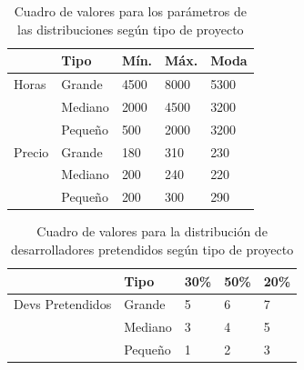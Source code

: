 \begin{table}[H]
\begin{center}
\begin{tabular}{|l|l|l|l|l|}
\hline
                    & Tipo      & Mín.    & Máx.    & Moda\\
\hline
    Horas           & Grande    & 4500    & 8000    & 5300\\
\hline
                    & Mediano   & 2000    & 4500    & 3200\\
\hline
                    & Pequeño   & 500     & 2000    & 3200\\
\hline
    Precio          & Grande    & 180     & 310     & 230\\
\hline
                    & Mediano   & 200     & 240     & 220\\
\hline
                    & Pequeño   & 200     & 300     & 290\\
\hline
\end{tabular}
\end{center}
\caption{Cuadro de valores para los parámetros de las distribuciones según tipo de proyecto}
\label{tab:va}
\end{table}

\begin{table}[H]
\begin{center}
\begin{tabular}{|l|l|l|l|l|}
\hline
                    & Tipo      & 30\%    & 50\%    & 20\%\\
\hline
Devs Pretendidos    & Grande    & 5       & 6       & 7\\
\hline
                    & Mediano   & 3       & 4       & 5\\
\hline
                    & Pequeño   & 1       & 2      & 3\\
\hline
\end{tabular}
\end{center}
\caption{Cuadro de valores para la distribución de desarrolladores pretendidos según tipo de proyecto}
\label{tab:va}
\end{table}



